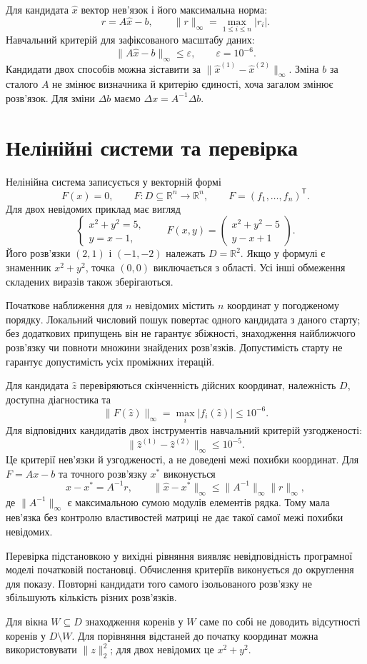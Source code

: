 \documentclass[11pt,a4paper]{article}
\theoremstyle{definition}
\begin{document}
Для кандидата $\widehat x$ вектор нев'язок і його максимальна норма:
\[
r=A\widehat x-b,\qquad
\|r\|_\infty=\max_{1\le i\le n}|r_i|.
\]
Навчальний критерій для зафіксованого масштабу даних:
\[
\|A\widehat x-b\|_\infty\le\varepsilon,
\qquad\varepsilon=10^{-6}.
\]
Кандидати двох способів можна зіставити за
$\|\widehat x^{(1)}-\widehat x^{(2)}\|_\infty$.
Зміна $b$ за сталого $A$ не змінює визначника й критерію єдиності,
хоча загалом змінює розв'язок. Для зміни $\Delta b$ маємо
$\Delta x=A^{-1}\Delta b$.

\section{Нелінійні системи та перевірка}
Нелінійна система записується у векторній формі
\[
F(x)=0,\qquad F:D\subseteq\mathbb R^n\to\mathbb R^n,
\qquad F=(f_1,\ldots,f_n)^{\mathsf T}.
\]
Для двох невідомих приклад має вигляд
\[
\begin{cases}x^2+y^2=5,\\y=x-1,\end{cases}
\qquad
F(x,y)=\begin{pmatrix}x^2+y^2-5\\y-x+1\end{pmatrix}.
\]
Його розв'язки $(2,1)$ і $(-1,-2)$ належать $D=\mathbb R^2$.
Якщо у формулі є знаменник $x^2+y^2$, точка $(0,0)$ виключається
з області. Усі інші обмеження складених виразів також зберігаються.

Початкове наближення для $n$ невідомих містить $n$ координат у
погодженому порядку. Локальний числовий пошук повертає одного
кандидата з даного старту; без додаткових припущень він не гарантує
збіжності, знаходження найближчого розв'язку чи повноти множини
знайдених розв'язків. Допустимість старту не гарантує допустимість
усіх проміжних ітерацій.

Для кандидата $\widehat z$ перевіряються скінченність дійсних координат,
належність $D$, доступна діагностика та
\[
\|F(\widehat z)\|_\infty
=\max_i|f_i(\widehat z)|\le10^{-6}.
\]
Для відповідних кандидатів двох інструментів навчальний критерій
узгодженості:
\[
\|\widehat z^{(1)}-\widehat z^{(2)}\|_\infty\le10^{-5}.
\]
Це критерії нев'язки й узгодженості, а не доведені межі похибки координат.
Для $F=Ax-b$ та точного розв'язку $x^*$ виконується
\[
\widehat x-x^*=A^{-1}r,
\qquad\|\widehat x-x^*\|_\infty
\le\|A^{-1}\|_\infty\|r\|_\infty,
\]
де $\|A^{-1}\|_\infty$ є максимальною сумою модулів елементів рядка.
Тому мала нев'язка без контролю властивостей матриці не дає такої самої
межі похибки невідомих.

Перевірка підстановкою у вихідні рівняння виявляє невідповідність
програмної моделі початковій постановці. Обчислення критеріїв виконується
до округлення для показу. Повторні кандидати того самого ізольованого
розв'язку не збільшують кількість різних розв'язків.

Для вікна $W\subseteq D$ знаходження коренів у $W$ саме по собі не
доводить відсутності коренів у $D\setminus W$. Для порівняння відстаней
до початку координат можна використовувати $\|z\|_2^2$;
для двох невідомих це $x^2+y^2$.
\end{document}
